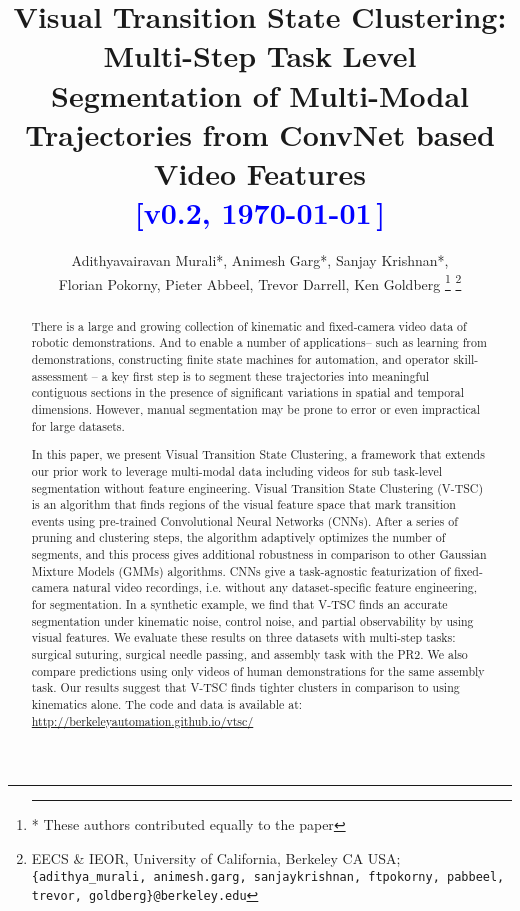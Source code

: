 \documentclass[letterpaper, 10 pt, conference]{ieeeconf}
\title{\LARGE \bf
Visual Transition State Clustering: Multi-Step Task Level Segmentation of Multi-Modal Trajectories from ConvNet\del{Can either Deep Learning} based Video Features\\
{\textcolor{blue}{[v0.2, \today\,\currenttime]}} }
\author{%
Adithyavairavan Murali*, Animesh Garg*, Sanjay Krishnan*,\\ Florian Pokorny,
Pieter Abbeel, Trevor Darrell, Ken Goldberg 
\thanks{\hrule \vspace{5pt} * These authors contributed equally to the paper}%
\thanks{EECS \& IEOR, University of California, Berkeley CA USA; \texttt{\{adithya\_murali, animesh.garg, sanjaykrishnan, ftpokorny, pabbeel, trevor, goldberg\}@berkeley.edu}}%
}
\newcommand{\tsc}{V-TSC\xspace}
\begin{document}
\maketitle

\begin{abstract}
There is a large and growing collection of kinematic and fixed-camera video data of robotic demonstrations.
And to enable a number of applications-- such as learning from demonstrations, constructing finite state machines for automation, and operator skill-assessment -- a key first step is to segment these trajectories into meaningful contiguous sections in the presence of significant variations in spatial and temporal dimensions.  
However, manual segmentation may be prone to error or even impractical for large datasets.

In this paper, we present Visual Transition State Clustering, a framework that extends our prior work to leverage multi-modal data including videos  for sub task-level segmentation without feature engineering. Visual Transition State Clustering (\tsc) is an algorithm that finds regions of the visual feature space that mark transition events using pre-trained Convolutional Neural Networks (CNNs).
After a series of pruning and clustering steps, the algorithm adaptively optimizes the number of segments, and this process gives additional robustness in comparison to other Gaussian Mixture Models (GMMs) algorithms.
CNNs give a task-agnostic featurization of  fixed-camera natural video recordings, i.e. without any dataset-specific feature engineering, for segmentation.
In a synthetic example, we find that \tsc finds an accurate segmentation under kinematic noise, control noise, and partial observability by using visual features. 
We evaluate these results on three datasets with multi-step tasks: surgical suturing, surgical needle passing, and assembly task with the PR2. We also compare predictions using only videos of human demonstrations for the same assembly task.
Our results suggest that \tsc finds  tighter clusters in comparison to using kinematics alone. 
The code and data is available at: 
\href{http://berkeleyautomation.github.io/surgical-tools/}{http://berkeleyautomation.github.io/vtsc/}
\end{abstract} 

\fontsize{10pt}{11.5pt}
\selectfont








\end{document}
